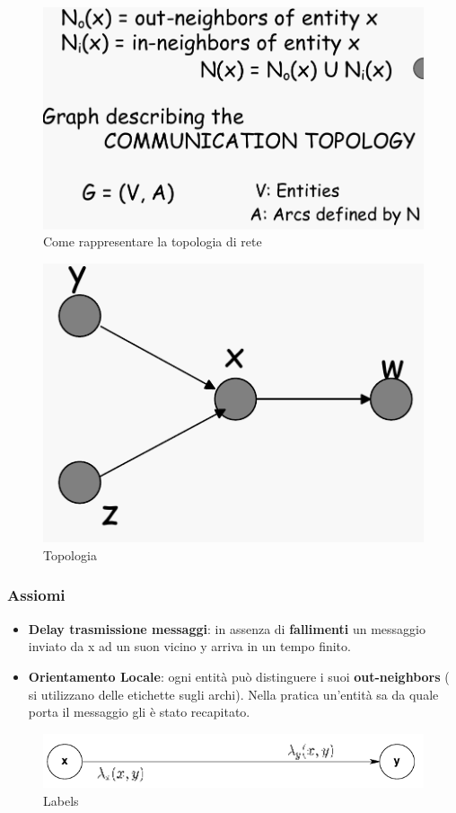 \documentclass[12pt]{article}
\begin{document}
		\begin{figure}[h!]
			\centering
			\includegraphics[scale=0.30]{img/comun.png}
			\caption{Come rappresentare la topologia di rete}
		\end{figure}
		\begin{figure}[h!]
			\centering
			\includegraphics[scale=0.30]{img/graph.png}
			\caption{Topologia}
		\end{figure}
	
		\subsubsection{Assiomi}
			\begin{itemize}
				\item \textbf{Delay trasmissione messaggi}: in assenza di \textbf{fallimenti} un messaggio inviato da x ad un suon vicino y arriva in un tempo finito.
				\item \textbf{Orientamento Locale}: ogni entità può distinguere i suoi \textbf{out-neighbors} ( si utilizzano delle etichette sugli archi). Nella pratica un'entità sa da quale porta il messaggio gli è stato recapitato.
			\end{itemize}
			\begin{figure}[h!]
				\centering
				\includegraphics[scale=0.40]{img/lab.png}
				\caption{Labels}
			\end{figure}
		
\end{document}
